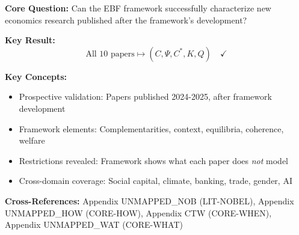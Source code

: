 
\begin{abstract}
This appendix demonstrates the EBF framework's \emph{prospective} application
by analyzing ten papers published in 2024--2025. Unlike the Nobel retrospective
(Appendix UNMAPPED_NOB), these papers were published \emph{after} the framework was
conceived. This tests the claim that any new economics paper can be
characterized in terms of $(C, \Psi, C^*, K, Q)$. All ten papers map
successfully, with complementarities ($C^{SS}$, $C^{market}$, $C^{F,Political}$),
context dimensions ($\Psi_{neighborhood}$, $\Psi_{policy}$, $\Psi_{inst}$),
and all FEPSDE welfare dimensions appearing across the sample.
\end{abstract}

\begin{tcolorbox}[colback=blue!5!white, colframe=blue!75!black,
    title=Quick Reference: Recent Papers Integration]

\textbf{Core Question:} Can the EBF framework successfully characterize new
economics research published after the framework's development?

\textbf{Key Result:}
\begin{equation}
\text{All 10 papers} \mapsto (C, \Psi, C^*, K, Q) \quad \checkmark
\end{equation}

\textbf{Key Concepts:}
\begin{itemize}[nosep]
\item Prospective validation: Papers published 2024-2025, after framework development
\item Framework elements: Complementarities, context, equilibria, coherence, welfare
\item Restrictions revealed: Framework shows what each paper does \emph{not} model
\item Cross-domain coverage: Social capital, climate, banking, trade, gender, AI
\end{itemize}

\textbf{Cross-References:} Appendix UNMAPPED_NOB (LIT-NOBEL), Appendix UNMAPPED_HOW (CORE-HOW),
Appendix CTW (CORE-WHEN), Appendix UNMAPPED_WAT (CORE-WHAT)
\end{tcolorbox}



